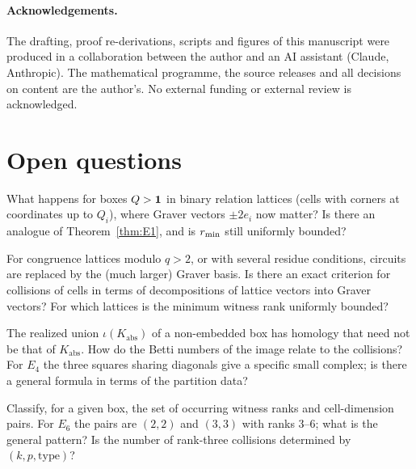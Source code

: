 \paragraph{Acknowledgements.} The drafting, proof re-derivations, scripts and figures of this manuscript were produced in a collaboration between the author and an AI assistant (Claude, Anthropic). The mathematical programme, the source releases and all decisions on content are the author's. No external funding or external review is acknowledged.

\section{Open questions}\label{sec:open}

\begin{question}\label{q:beyond}
What happens for boxes $Q>\mathbf 1$ in binary relation lattices (cells with corners at coordinates up to $Q_i$), where Graver vectors $\pm2e_i$ now matter? Is there an analogue of Theorem~\ref{thm:E1}, and is $r_{\min}$ still uniformly bounded?
\end{question}

\begin{question}\label{q:moduli}
For congruence lattices modulo $q>2$, or with several residue conditions, circuits are replaced by the (much larger) Graver basis. Is there an exact criterion for collisions of cells in terms of decompositions of lattice vectors into Graver vectors? For which lattices is the minimum witness rank uniformly bounded?
\end{question}

\begin{question}\label{q:topology}
The realized union $\iota(K_{\mathrm{abs}})$ of a non-embedded box has homology that need not be that of $K_{\mathrm{abs}}$. How do the Betti numbers of the image relate to the collisions? For $E_4$ the three squares sharing diagonals give a specific small complex; is there a general formula in terms of the partition data?
\end{question}

\begin{question}\label{q:collisions}
Classify, for a given box, the set of occurring witness ranks and cell-dimension pairs. For $E_6$ the pairs are $(2,2)$ and $(3,3)$ with ranks $3$--$6$; what is the general pattern? Is the number of rank-three collisions determined by $(k,p,\text{type})$?
\end{question}

